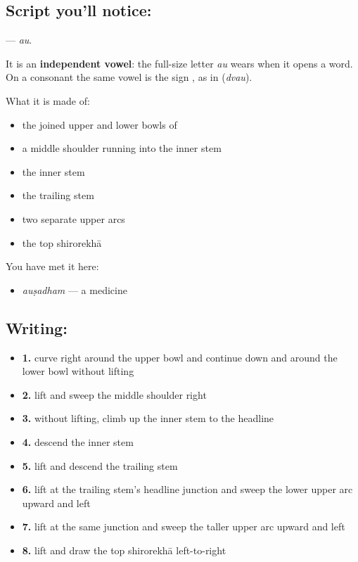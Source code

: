 \subsection*{Script you'll notice: }
\textbf{} — \emph{au}.

It is an \textbf{independent vowel}: the full-size letter \emph{au} wears when it opens a word. On a consonant the same vowel is the sign \textbf{}, as in \textbf{} (\emph{dvau}).

What it is made of:

\begin{itemize}
\raggedright
  \item the joined upper and lower bowls of 
  \item a middle shoulder running into the inner stem
  \item the inner stem
  \item the trailing stem
  \item two separate upper arcs
  \item the top shirorekhā
\end{itemize}

You have met it here:

\begin{itemize}
\raggedright
  \item \textbf{} \emph{auṣadham} — a medicine
\end{itemize}

\subsection*{Writing: }

\begin{itemize}
\raggedright
  \item \textbf{1.} curve right around the upper bowl and continue down and around the lower bowl without lifting
  \item \textbf{2.} lift and sweep the middle shoulder right
  \item \textbf{3.} without lifting, climb up the inner stem to the headline
  \item \textbf{4.} descend the inner stem
  \item \textbf{5.} lift and descend the trailing stem
  \item \textbf{6.} lift at the trailing stem's headline junction and sweep the lower upper arc upward and left
  \item \textbf{7.} lift at the same junction and sweep the taller upper arc upward and left
  \item \textbf{8.} lift and draw the top shirorekhā left-to-right
\end{itemize}


